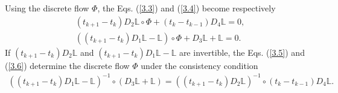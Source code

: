 \documentclass[a4paper,a4paper]{article}
\begin{document}
Using the discrete flow $\Phi$, the Eqs. (\ref{3.3}) and (\ref{3.4}) become
respectively
\begin{align}
  &(t_{k+1}-t_{k})D_{2}\mathbb{L}\circ\Phi +
     (t_{k}-t_{k-1})D_{4}\mathbb{L}=0, \label{3.5}\\
  &((t_{k+1}-t_{k})D_{1}\mathbb{L}-\mathbb{L})\circ\Phi +
   D_{3}\mathbb{L}+\mathbb{L}=0. \label{3.6}
\end{align}
If $(t_{k+1}-t_{k})D_{2}\mathbb{L}$ and $(t_{k+1}-t_{k})D_{1}\mathbb{L}-\mathbb{L}$
are invertible, the Eqs.
(\ref{3.5}) and (\ref{3.6}) determine the discrete flow $\Phi$ under
the consistency condition
\begin{align}
   ((t_{k+1}-t_{k})D_{1}\mathbb{L}-\mathbb{L})^{-1}\circ (D_{3}\mathbb{L}+\mathbb{L})
    =((t_{k+1}-t_{k})D_{2}\mathbb{L})^{-1}\circ (t_{k}-t_{k-1})D_{4}\mathbb{L}.
\end{align}
\end{document}
